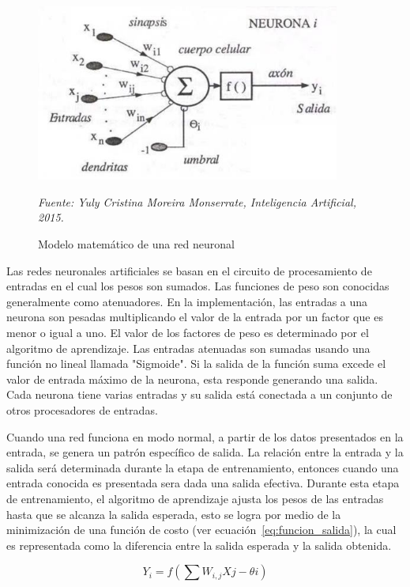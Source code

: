 \begin{figure}[H]
		\centering
		\includegraphics[width=100mm]{Imagenes/neurona_artificial.png}
		\caption{Modelo matemático de una red neuronal}
		\vspace{0.15cm}
		\textit{Fuente: Yuly Cristina Moreira Monserrate, Inteligencia Artificial, 2015.}
		\label{fig:neurona_artificial}
\end{figure}

Las redes neuronales artificiales se basan en el circuito de procesamiento de entradas en el cual los pesos son sumados. Las funciones de peso son conocidas generalmente como atenuadores. En la implementación, las entradas a una neurona son pesadas multiplicando el valor de la entrada por un factor que es menor o igual a uno. El valor de los factores de peso es determinado por el algoritmo de aprendizaje. Las entradas atenuadas son sumadas usando una función no lineal llamada "Sigmoide". Si la salida de la función suma excede el valor de entrada máximo de la neurona, esta responde generando una salida. Cada neurona tiene varias entradas y su salida está conectada a un conjunto de otros procesadores de entradas.

Cuando una red funciona en modo normal, a partir de los datos presentados en la entrada, se genera un patrón específico de salida. La relación entre la entrada y la salida será determinada durante la etapa de  entrenamiento, entonces cuando una entrada conocida es presentada sera dada una salida efectiva. Durante esta etapa de entrenamiento, el algoritmo de aprendizaje ajusta los pesos de las entradas hasta que se alcanza la salida esperada, esto se logra por medio de la minimización de una función de costo (ver ecuación~\ref{eq:funcion_salida}), la cual es representada como la diferencia entre la salida esperada y la salida obtenida.

\begin{equation}\label{eq:funcion_salida}
Y_{i} = f(\sum W_{i,j}X{j} - \theta{i})
\end{equation}

